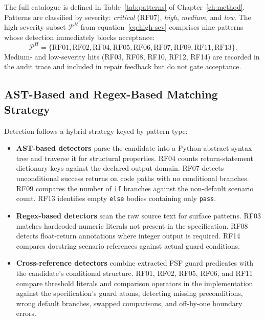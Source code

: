 The full catalogue is defined in Table~\ref{tab:patterns} of
Chapter~\ref{ch:method}.  Patterns are classified by severity:
\emph{critical} (RF07), \emph{high}, \emph{medium}, and \emph{low}.
The high-severity subset $\mathcal{P}^H$ from
equation~\eqref{eq:high-sev} comprises nine patterns whose detection
immediately blocks acceptance:
\[
  \mathcal{P}^H = \{\text{RF01}, \text{RF02}, \text{RF04}, \text{RF05},
    \text{RF06}, \text{RF07}, \text{RF09}, \text{RF11}, \text{RF13}\}.
\]
Medium- and low-severity hits (RF03, RF08, RF10, RF12, RF14) are recorded in
the audit trace and included in repair feedback but do not gate acceptance.

\subsection{AST-Based and Regex-Based Matching Strategy}

Detection follows a hybrid strategy keyed by pattern type:

\begin{itemize}
  \item \textbf{AST-based detectors} parse the candidate into a Python
        abstract syntax tree and traverse it for structural properties.
        RF04 counts return-statement dictionary keys against the declared
        output domain.  RF07 detects unconditional success returns on code
        paths with no conditional branches.  RF09 compares the number of
        \texttt{if} branches against the non-default scenario count.
        RF13 identifies empty \texttt{else} bodies containing only
        \texttt{pass}.
  \item \textbf{Regex-based detectors} scan the raw source text for surface
        patterns.  RF03 matches hardcoded numeric literals not present in
        the specification.  RF08 detects float-return annotations where
        integer output is required.  RF14 compares docstring scenario
        references against actual guard conditions.
  \item \textbf{Cross-reference detectors} combine extracted FSF guard
        predicates with the candidate's conditional structure.  RF01, RF02,
        RF05, RF06, and RF11 compare threshold literals and comparison
        operators in the implementation against the specification's guard
        atoms, detecting missing preconditions, wrong default branches,
        swapped comparisons, and off-by-one boundary errors.
\end{itemize}

